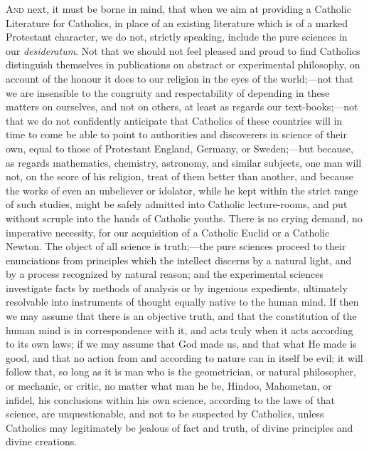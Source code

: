 A\textsc{nd} next, it must be borne in mind, that when we aim at providing a
Catholic Literature for Catholics, in place of an existing literature
which is of a marked Protestant character, we do not, strictly
speaking, include the pure sciences in our \emph{desideratum}. Not
that we should not feel pleased and proud to find Catholics
distinguish themselves in publications on abstract or experimental
philosophy, on account of the honour it does to our religion in the
eyes of the world;—not that we are insensible to the congruity and
respectability of depending in these matters on ourselves, and not on
others, at least as regards our text-books;—not that we do not
confidently anticipate that Catholics of these countries will in time
to come be able to point to authorities and discoverers in science of
their own, equal to those of Protestant England, Germany, or Sweden;—but
because, as regards mathematics, chemistry, astronomy, and similar
subjects, one man will not, on the score of his religion, treat of
them better than another, and because the works of even an unbeliever
or idolator, while he kept within the strict range of such studies,
might be safely admitted into Catholic lecture-rooms, and put without
scruple into the hands of Catholic youths. There is no crying demand,
no imperative necessity, for our acquisition of a Catholic Euclid or a
Catholic Newton. The object of all science is truth;—the pure sciences proceed to their enunciations from principles which the
intellect discerns by a natural light, and by a process recognized by
natural reason; and the experimental sciences investigate facts by
methods of analysis or by ingenious expedients, ultimately resolvable
into instruments of thought equally native to the human mind. If then
we may assume that there is an objective truth, and that the
constitution of the human mind is in correspondence with it, and acts
truly when it acts according to its own laws; if we may assume that
God made us, and that what He made is good, and that no action from
and according to nature can in itself be evil; it will follow that, so
long as it is man who is the geometrician, or natural philosopher, or
mechanic, or critic, no matter what man he be, Hindoo, Mahometan, or
infidel, his conclusions within his own science, according to the laws
of that science, are unquestionable, and not to be suspected by
Catholics, unless Catholics may legitimately be jealous of fact and
truth, of divine principles and divine creations.

